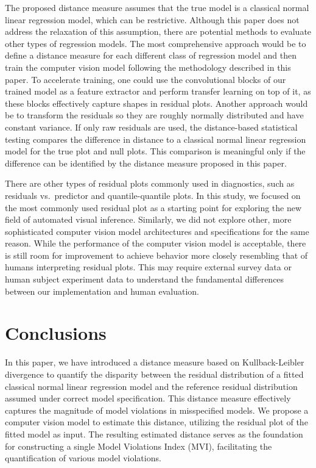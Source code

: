 \documentclass[]{interact}
\theoremstyle{plain}%
\theoremstyle{definition}
\theoremstyle{remark}
\begin{document}
The proposed distance measure assumes that the true model is a classical
normal linear regression model, which can be restrictive. Although this
paper does not address the relaxation of this assumption, there are
potential methods to evaluate other types of regression models. The most
comprehensive approach would be to define a distance measure for each
different class of regression model and then train the computer vision
model following the methodology described in this paper. To accelerate
training, one could use the convolutional blocks of our trained model as
a feature extractor and perform transfer learning on top of it, as these
blocks effectively capture shapes in residual plots. Another approach
would be to transform the residuals so they are roughly normally
distributed and have constant variance. If only raw residuals are used,
the distance-based statistical testing compares the difference in
distance to a classical normal linear regression model for the true plot
and null plots. This comparison is meaningful only if the difference can
be identified by the distance measure proposed in this paper.

There are other types of residual plots commonly used in diagnostics,
such as residuals vs.~predictor and quantile-quantile plots. In this
study, we focused on the most commonly used residual plot as a starting
point for exploring the new field of automated visual inference.
Similarly, we did not explore other, more sophisticated computer vision
model architectures and specifications for the same reason. While the
performance of the computer vision model is acceptable, there is still
room for improvement to achieve behavior more closely resembling that of
humans interpreting residual plots. This may require external survey
data or human subject experiment data to understand the fundamental
differences between our implementation and human evaluation.

\section{Conclusions}\label{conclusions}

In this paper, we have introduced a distance measure based on
Kullback-Leibler divergence to quantify the disparity between the
residual distribution of a fitted classical normal linear regression
model and the reference residual distribution assumed under correct
model specification. This distance measure effectively captures the
magnitude of model violations in misspecified models. We propose a
computer vision model to estimate this distance, utilizing the residual
plot of the fitted model as input. The resulting estimated distance
serves as the foundation for constructing a single Model Violations
Index (MVI), facilitating the quantification of various model
violations.
\end{document}
